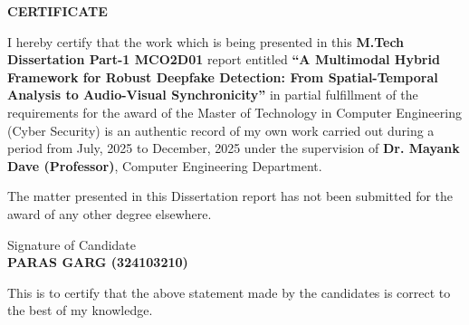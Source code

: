 \documentclass[12pt,oneside,a4paper]{report}
\numberwithin{figure}{chapter}
\numberwithin{table}{chapter}
\begin{document}
\clearpage
\pagestyle{plain}



\vspace*{1cm}
\begin{center}
    {\LARGE \textbf{CERTIFICATE}}
\end{center}

\vspace{0.8cm}

\noindent I hereby certify that the work which is being presented in this \textbf{M.Tech Dissertation Part-1 MCO2D01} report entitled \textbf{``A Multimodal Hybrid Framework for Robust Deepfake Detection: From Spatial-Temporal Analysis to Audio-Visual Synchronicity''} in partial fulfillment of the requirements for the award of the Master of Technology in Computer Engineering (Cyber Security) is an authentic record of my own work carried out during a period from July, 2025 to December, 2025 under the supervision of \textbf{Dr. Mayank Dave (Professor)}, Computer Engineering Department.

\vspace{0.5cm}

\noindent The matter presented in this Dissertation report has not been submitted for the award of any other degree elsewhere.

\vspace{1.5cm}

\begin{flushright}
\parbox{6cm}{
    Signature of Candidate\\[0.5cm]
    \textbf{PARAS GARG (324103210)}
}
\end{flushright}

\vspace{1cm}

\noindent This is to certify that the above statement made by the candidates is correct to the best of my knowledge.
\end{document}
